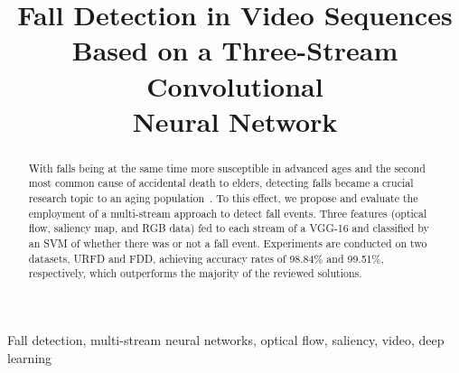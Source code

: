 \documentclass[conference]{IEEEtran}
\begin{document}
\title{Fall Detection in Video Sequences\\ Based on a Three-Stream Convolutional\\ Neural Network}


\maketitle

\begin{abstract}
With falls being at the same time more susceptible in advanced ages and the second most common cause of accidental death to elders, detecting falls became a crucial research topic to an aging population~\cite{who2007report}. To this effect, we propose and evaluate the employment of a multi-stream approach to detect fall events. Three features (optical flow, saliency map, and RGB data) fed to each stream of a VGG-16 and classified by an SVM of whether there was or not a fall event. Experiments are conducted on two datasets, URFD and FDD, achieving accuracy rates of 98.84\% and 99.51\%, respectively, which outperforms the majority of the reviewed solutions.
\end{abstract}

\begin{IEEEkeywords}
Fall detection, multi-stream neural networks, optical flow, saliency, video, deep learning
\end{IEEEkeywords}
\end{document}
